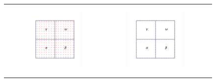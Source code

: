 \begin{figure}
    \centering
    \begin{tabular}{ccc}
        \begin{subfigure}[t]{0.3\textwidth}
            \centering
            \includegraphics[width=\textwidth, clip=true, trim={100 150 100 150}]{../figures/four_patches.pdf}
            \label{subfig:4_patches_with_grid}
        \end{subfigure}
        &
        \begin{subfigure}[t]{0.3\textwidth}
            \centering
            \includegraphics[width=\textwidth, clip=true, trim={100 150 100 150}]{../figures/four_patches_without_points.pdf}

\end{subfigure}
\end{tabular}
\end{figure}
